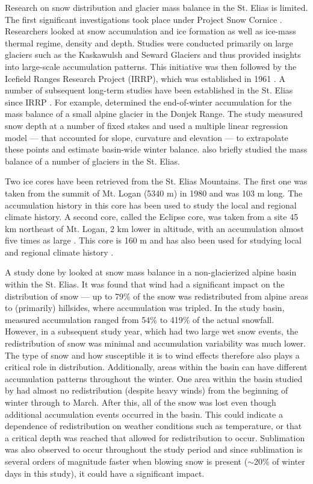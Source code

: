 \documentclass{sfuthesis}
\begin{document}
\begin{appendices}
Research on snow distribution and glacier mass balance in the St. Elias is limited. The first significant investigations took place under Project Snow Cornice \citep{Wood1948}. Researchers looked at snow accumulation and ice formation as well as ice-mass thermal regime, density and depth. Studies were conducted primarily on large glaciers such as the Kaskawulsh and Seward Glaciers and thus provided insights into large-scale accumulation patterns. This initiative was then followed by the Icefield Ranges Research Project (IRRP), which was established in 1961 \citep{Danby2003}. A number of subsequent long-term studies have been established in the St. Elias since IRRP \citep[e.g.][]{Clarke1984, Paoli2009}. For example, \cite{Wheler2014} determined the end-of-winter accumulation for the mass balance of a small alpine glacier in the Donjek Range. The study measured snow depth at a number of fixed stakes and used a multiple linear regression model --- that accounted for slope, curvature and elevation --- to extrapolate these points and estimate basin-wide winter balance. \cite{Arendt2008} also briefly studied the mass balance of a number of glaciers in the St. Elias.

Two ice cores have been retrieved from the St. Elias Mountains. The first one was taken from the summit of Mt. Logan (5340 m) in 1980 and was 103 m long. The accumulation history in this core has been used to study the local \citep{Holdsworth1991} and regional \citep{Moore2002} climate history. A second core, called the Eclipse core, was taken from a site 45 km northeast of Mt. Logan, 2 km lower in altitude, with an accumulation almost five times as large \citep{Wake2002}. This core is 160 m and has also been used for studying local and regional climate history \citep{Wake2002}. 

A study done by \cite{Pomeroy1999} looked at snow mass balance in a non-glacierized alpine basin within the St. Elias. It was found that wind had a significant impact on the distribution of snow --- up to 79$\%$ of the snow was redistributed from alpine areas to (primarily) hillsides, where accumulation was tripled. In the study basin, measured accumulation ranged from 54$\%$ to 419$\%$ of the actual snowfall. However, in a subsequent study year, which had two large wet snow events, the redistribution of snow was minimal and accumulation variability was much lower. The type of snow and how susceptible it is to wind effects therefore also plays a critical role in distribution. Additionally, areas within the basin can have different accumulation patterns throughout the winter. One area within the basin studied by \cite{Pomeroy1999} had almost no redistribution (despite heavy winds) from the beginning of winter through to March. After this, all of the snow was lost even though additional accumulation events occurred in the basin. This could indicate a dependence of redistribution on weather conditions such as temperature, or that a critical depth was reached that allowed for redistribution to occur. Sublimation was also observed to occur throughout the study period and since sublimation is several orders of magnitude faster when blowing snow is present ($\sim$20\% of winter days in this study), it could have a significant impact.


\end{appendices}
\end{document}
